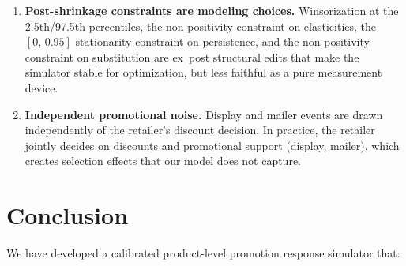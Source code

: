 \documentclass[12pt,a4paper]{article}
\begin{document}
\begin{enumerate}[nosep]
\item \textbf{Post-shrinkage constraints are modeling choices.}
Winsorization at the 2.5th/97.5th percentiles, the non-positivity
constraint on elasticities, the $[0,\,0.95]$ stationarity constraint
on persistence, and the non-positivity constraint on substitution
are ex~post structural edits that make the simulator stable for
optimization, but less faithful as a pure measurement device.

\item \textbf{Independent promotional noise.} Display and mailer
events are drawn independently of the retailer's discount decision.
In practice, the retailer jointly decides on discounts and
promotional support (display, mailer), which creates
selection effects that our model does not capture.
\end{enumerate}

\section{Conclusion}
\label{sec:conclusion}

We have developed a calibrated product-level promotion response
simulator that:
\end{document}
